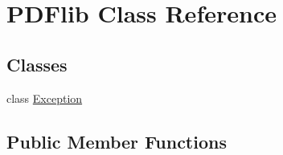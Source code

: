 \hypertarget{classPDFlib}{}\section{P\+D\+Flib Class Reference}
\label{classPDFlib}
\subsection*{Classes}
\begin{DoxyCompactItemize}
\item 
class \hyperlink{classPDFlib_1_1Exception}{Exception}
\end{DoxyCompactItemize}
\subsection*{Public Member Functions}
